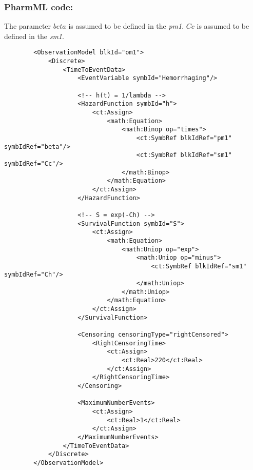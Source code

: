 \subsubsection{PharmML code:}
The parameter $beta$ is assumed to be defined in the  \emph{pm1}. 
$Cc$ is assumed to be defined in the  \emph{sm1}.

\lstset{language=XML}
\begin{lstlisting}
        <ObservationModel blkId="om1">
            <Discrete>
                <TimeToEventData>
                    <EventVariable symbId="Hemorrhaging"/>
                    
                    <!-- h(t) = 1/lambda -->
                    <HazardFunction symbId="h">
                        <ct:Assign>
                            <math:Equation>
                                <math:Binop op="times">
                                    <ct:SymbRef blkIdRef="pm1" symbIdRef="beta"/>
                                    <ct:SymbRef blkIdRef="sm1" symbIdRef="Cc"/>
                                </math:Binop>
                            </math:Equation>
                        </ct:Assign>   
                    </HazardFunction>
                    
                    <!-- S = exp(-Ch) -->
                    <SurvivalFunction symbId="S">
                        <ct:Assign>
                            <math:Equation>
                                <math:Uniop op="exp">
                                    <math:Uniop op="minus">
                                        <ct:SymbRef blkIdRef="sm1" symbIdRef="Ch"/>
                                    </math:Uniop>
                                </math:Uniop>
                            </math:Equation>
                        </ct:Assign>
                    </SurvivalFunction>
                    
                    <Censoring censoringType="rightCensored">
                        <RightCensoringTime>
                            <ct:Assign>
                                <ct:Real>220</ct:Real> 
                            </ct:Assign>
                        </RightCensoringTime>
                    </Censoring>                    
                    
                    <MaximumNumberEvents>
                        <ct:Assign>
                            <ct:Real>1</ct:Real> 
                        </ct:Assign>
                    </MaximumNumberEvents>
                </TimeToEventData>
            </Discrete>
        </ObservationModel>
\end{lstlisting}

